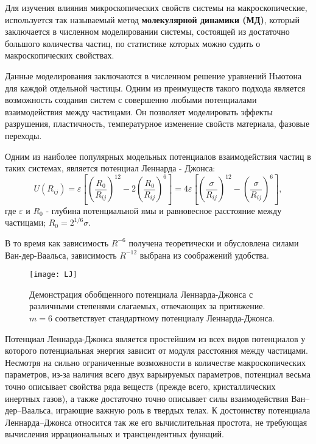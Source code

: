 Для изучения влияния микроскопических свойств системы на макроскопические, используется так называемый метод \textbf{молекулярной динамики (МД)}, который заключается в численном моделировании системы, состоящей из достаточно большого количества частиц, по статистике которых можно судить о макроскопических свойствах. 

Данные моделирования заключаются в численном решение уравнений Ньютона для каждой отдельной частицы. Одним из преимуществ такого подхода является возможность создания систем с совершенно любыми потенциалами взаимодействия между частицами. Он позволяет моделировать эффекты разрушения, пластичность, температурное изменение свойств материала, фазовые переходы.

Одним из наиболее популярных модельных потенциалов взаимодействия частиц в таких системах, является потенциал Леннарда - Джонса:
\begin{equation}
U\left(R_{i j}\right)=\varepsilon\left[\left(\frac{R_{0}}{R_{i j}}\right)^{12}-2\left(\frac{R_{0}}{R_{i j}}\right)^{6}\right]=4 \varepsilon\left[\left(\frac{\sigma}{R_{i j}}\right)^{12}-\left(\frac{\sigma}{R_{i j}}\right)^{6}\right], 
\label{eqFullLJ}
\end{equation}
где $\varepsilon$ и $R_0$ - глубина потенциальной ямы и равновесное расстояние между частицами; $R_0 = 2^{1/6}\sigma$.

В то время как зависимость $R^{-6}$ получена теоретически и обусловлена силами Ван-дер-Ваальса, зависимость $R^{-12}$ выбрана из соображений удобства.

\begin{figure}[h]
\begin{center}
\texttt{[image: LJ]}
\caption{Демонстрация обобщенного потенциала Леннарда-Джонса с различными степенями слагаемых, отвечающих за притяжение. $m = 6$ соответствует стандартному потенциалу Леннарда-Джонса.}
\label{risLJvar}
\end{center}
\end{figure}

Потенциал Леннарда-Джонса является простейшим из всех видов потенциалов у которого потенциальная энергия зависит от модуля расстояния между частицами. Несмотря на сильно ограниченные возможности в количестве макроскопических параметров, из-за наличия всего двух варьируемых параметров, потенциал весьма точно описывает свойства ряда веществ (прежде всего, кристаллических инертных газов), а также достаточно точно описывает силы взаимодействия Ван–дер–Ваальса, играющие важную роль в твердых телах. К достоинству потенциала Леннарда–Джонса относится так же его вычислительная простота, не требующая вычисления иррациональных и трансцендентных функций.

